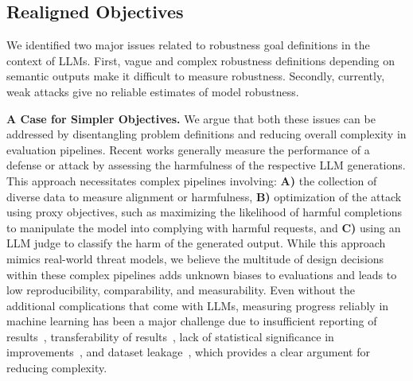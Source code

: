 

\vspace{-5pt}
\subsection{Realigned Objectives}\label{sec:pos-goals-realigned}

We identified two major issues related to robustness goal definitions in the context of LLMs. First, vague and complex robustness definitions depending on semantic outputs make it difficult to measure robustness. Secondly, currently, weak attacks give no reliable estimates of model robustness.  

\textbf{A Case for Simpler Objectives.} We argue that both these issues can be addressed by disentangling problem definitions and reducing overall complexity in evaluation pipelines. Recent works generally measure the performance of a defense or attack by assessing the harmfulness of the respective LLM generations. This approach necessitates complex pipelines involving: \textbf{A)} the collection of diverse data to measure alignment or harmfulness, \textbf{B)} optimization of the attack using proxy objectives, such as maximizing the likelihood of harmful completions to manipulate the model into complying with harmful requests, and \textbf{C)} using an LLM judge to classify the harm of the generated output. While this approach mimics real-world threat models, we believe the multitude of design decisions within these complex pipelines adds unknown biases to evaluations and leads to low reproducibility, comparability, and measurability. Even without the additional complications that come with LLMs, measuring progress reliably in machine learning has been a major challenge due to insufficient reporting of results~\cite{dodge2019show}, transferability of results~\cite{liao2021we}, lack of statistical significance in improvements~\cite{card2020little}, and dataset leakage~\cite{kapoor2022leakage}, which provides a clear argument for reducing complexity. 


